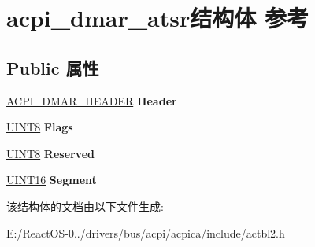 \hypertarget{structacpi__dmar__atsr}{}\section{acpi\+\_\+dmar\+\_\+atsr结构体 参考}
\label{structacpi__dmar__atsr}
\subsection*{Public 属性}
\begin{DoxyCompactItemize}
\item 
\mbox{\label{structacpi__dmar__atsr_ac8b9c2cc779874ea0f7befd1df17d732}} 
\hyperlink{structacpi__dmar__header}{A\+C\+P\+I\+\_\+\+D\+M\+A\+R\+\_\+\+H\+E\+A\+D\+ER} {\bfseries Header}
\item 
\mbox{\label{structacpi__dmar__atsr_a194cf3d6837e2f5a358fdfaf41fb76b5}} 
\hyperlink{_processor_bind_8h_ab27e9918b538ce9d8ca692479b375b6a}{U\+I\+N\+T8} {\bfseries Flags}
\item 
\mbox{\label{structacpi__dmar__atsr_a331cb233bc238be8d52c605871f2dea4}} 
\hyperlink{_processor_bind_8h_ab27e9918b538ce9d8ca692479b375b6a}{U\+I\+N\+T8} {\bfseries Reserved}
\item 
\mbox{\label{structacpi__dmar__atsr_ad91a792a71c504b677c54b06b2d7b5c7}} 
\hyperlink{_processor_bind_8h_a09f1a1fb2293e33483cc8d44aefb1eb1}{U\+I\+N\+T16} {\bfseries Segment}
\end{DoxyCompactItemize}


该结构体的文档由以下文件生成\+:\begin{DoxyCompactItemize}
\item 
E\+:/\+React\+O\+S-\/0../drivers/bus/acpi/acpica/include/actbl2.\+h\end{DoxyCompactItemize}
